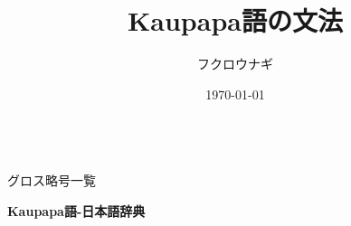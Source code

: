 \documentclass[uplatex, a4paper]{jsarticle}
\title{\textbf{Kaupapa語の文法}}
\author{
    フクロウナギ
    }
\date{\today}
\begin{document}
\maketitle
\newpage

\tableofcontents
　\\
グロス略号一覧\\
\printglossaries
\newpage


\newpage

\pagestyle{empty}
\begin{center}
    \vspace*{\fill}
    \Huge \textbf{Kaupapa語-日本語辞典}
    \vspace*{\fill}
\end{center}
\newpage

\pagestyle{plain} 
% 
\end{document}
